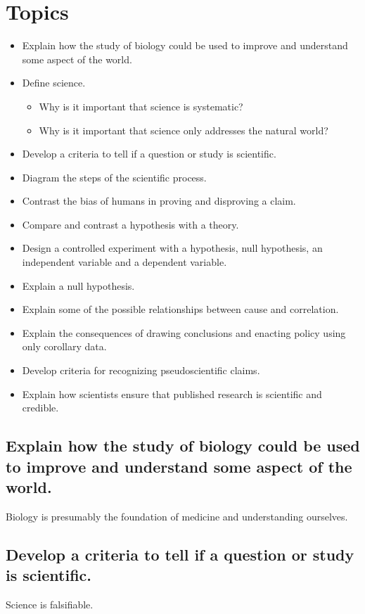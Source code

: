 \section{Topics}
\begin{itemize}
    \item{Explain how the study of biology could be used to improve and understand some aspect of the world.}
    \item{
        Define science.
        \begin{itemize}
            \item{Why is it important that science is systematic?}
            \item{Why is it important that science only addresses the natural world?}
        \end{itemize}
    }
    \item{Develop a criteria to tell if a question or study is scientific.}
    \item{Diagram the steps of the scientific process.}
    \item{Contrast the bias of humans in proving and disproving a claim.}
    \item{Compare and contrast a hypothesis with a theory.}
    \item{Design a controlled experiment with a hypothesis, null hypothesis, an independent variable and a dependent variable.}
    \item{Explain a null hypothesis.}
    \item{Explain some of the possible relationships between cause and correlation. }
    \item{Explain the consequences of drawing conclusions and enacting policy using only corollary data.}
    \item{Develop criteria for recognizing pseudoscientific claims.}
    \item{Explain how scientists ensure that published research is scientific and credible.}
\end{itemize}

\subsection{Explain how the study of biology could be used to improve and understand some aspect of the world.}
Biology is presumably the foundation of medicine and understanding ourselves.

\subsection{Develop a criteria to tell if a question or study is scientific.}
Science is falsifiable. 

